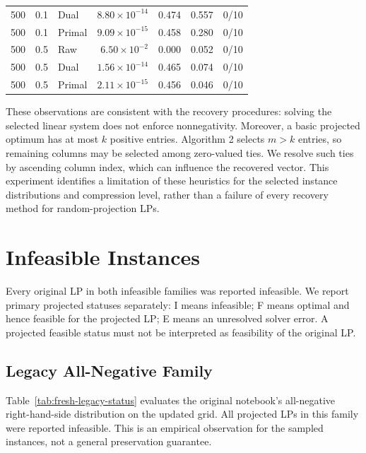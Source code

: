 \documentclass[12pt,letterpaper,oneside]{report}
\theoremstyle{definition}
\begin{document}
\begin{minipage}{\linewidth}
{\begin{tabular}{rr l rrr r}
500 & 0.1 & Dual & $8.80\times 10^{-14}$ & 0.474 & 0.557 & 0/10 \\
500 & 0.1 & Primal & $9.09\times 10^{-15}$ & 0.458 & 0.280 & 0/10 \\
500 & 0.5 & Raw & $6.50\times 10^{-2}$ & 0.000 & 0.052 & 0/10 \\
500 & 0.5 & Dual & $1.56\times 10^{-14}$ & 0.465 & 0.074 & 0/10 \\
500 & 0.5 & Primal & $2.11\times 10^{-15}$ & 0.456 & 0.046 & 0/10 \\
\bottomrule
\end{tabular}
}%
\ifdim\wd0>\linewidth
  \resizebox{\linewidth}{!}{\usebox0}
\else
  \usebox0
\fi
\end{minipage}
\par\medskip

These observations are consistent with the recovery procedures:
solving the selected linear system does not enforce nonnegativity.
Moreover, a basic projected optimum has at most $k$ positive entries.
Algorithm 2 selects $m>k$ entries, so remaining columns may be selected
among zero-valued ties. We resolve such ties by ascending column index,
which can influence the recovered vector. This experiment identifies a
limitation of these heuristics for the selected instance distributions
and compression level, rather than a failure of every recovery method
for random-projection LPs.

\section{Infeasible Instances}
Every original LP in both infeasible families was reported infeasible.
We report primary projected statuses separately: I means infeasible;
F means optimal and hence feasible for the projected LP; E means an
unresolved solver error. A projected feasible status must not be
interpreted as feasibility of the original LP.

\subsection{Legacy All-Negative Family}
Table~\ref{tab:fresh-legacy-status} evaluates the original notebook's all-negative
right-hand-side distribution on the updated grid. All projected LPs
in this family were reported infeasible. This is an empirical observation
for the sampled instances, not a general preservation guarantee.
\end{document}
